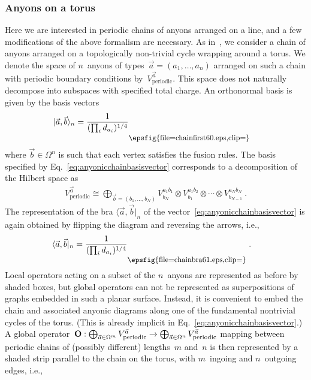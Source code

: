 \documentclass[floats,prb,twocolumn]{revtex4}
\newcommand*{\textfrac}[2]{{{#1}/{#2}}}
\newcommand{\ket}[1]{|#1\rangle}
\newcommand{\bra}[1]{\langle#1|}
\newcommand*{\Xsingleoperator}{{\bf O}}
\newcommand*{\chainfirst}{\raisebox{-21.123pt}{\epsfig{file=chainfirst60.eps,clip=}}}
\newcommand*{\chainbra}{\raisebox{-20.466pt}{\epsfig{file=chainbra61.eps,clip=}}}
\begin{document}
\subsubsection{Anyons on a torus}
Here we are interested in periodic chains of anyons arranged on a line, and  a few modifications of the above formalism are necessary. 
 As in~\cite{Feiguinetal07,Trebstetal08,Gilcollective09}, we consider a chain of anyons arranged on a topologically non-trivial cycle wrapping around a torus.  We denote the space of  $n$~anyons of types~$\vec{a}=(a_1,\ldots,a_n)$  arranged on such a chain with periodic boundary conditions by~$V^{\vec{a}}_{\textrm{periodic}}$. This space does not naturally decompose into subspaces with specified total charge.  An orthonormal  basis is given by the basis vectors
\begin{align}
\ket{\vec{a},\vec{b}}_n&=\frac{1}{(\prod_i d_{a_i})^{\textfrac{1}{4}}}\scalebox{0.9}{\chainfirst}\label{eq:anyonicchainbasisvector}
\end{align}
where $\vec{b}\in\Omega^n$ is such that each vertex satisfies the fusion rules.
The basis specified by Eq.~\eqref{eq:anyonicchainbasisvector} corresponds to a decomposition of the Hilbert space as
\begin{align*}
V^{\vec{a}}_{\textrm{periodic}}\cong \bigoplus_{\vec{b}=(b_1,\ldots,b_N)}V_{b_N}^{a_1b_1}\otimes V_{b_1}^{a_1b_2}\otimes\cdots\otimes V_{b_{N-1}}^{a_Nb_N}\ .
\end{align*}
The representation of the  bra $\bra{\vec{a},\vec{b}}_n$ of   the vector~\eqref{eq:anyonicchainbasisvector} is again obtained by flipping the diagram and reversing the arrows, i.e., 
\begin{align}
\bra{\vec{a},\vec{b}}_n &=\frac{1}{(\prod_i d_{a_i})^{1/4}}\scalebox{0.9}{\chainbra}\ .\label{eq:bravectorchain}
\end{align}
Local operators acting on a subset of the $n$~anyons are represented as before by shaded boxes,  but global operators can not be represented as superpositions of graphs embedded  in such a planar surface. Instead, it is convenient to embed the chain and associated anyonic diagrams along one of the fundamental nontrivial cycles of the torus. (This is  already implicit in Eq.~\eqref{eq:anyonicchainbasisvector}.) A global operator~$\Xsingleoperator:\bigoplus_{\vec{a}\in\Omega^m}V^{\vec{a}}_{\textrm{periodic}}\rightarrow \bigoplus_{\vec{a}\in\Omega^n}V^{\vec{a}}_{\textrm{periodic}}$ mapping between periodic chains of (possibly different) lengths~$m$ and~$n$ is then represented by a shaded strip parallel to the chain on the torus, with $m$~ingoing and $n$~outgoing edges, i.e.,
\end{document}
